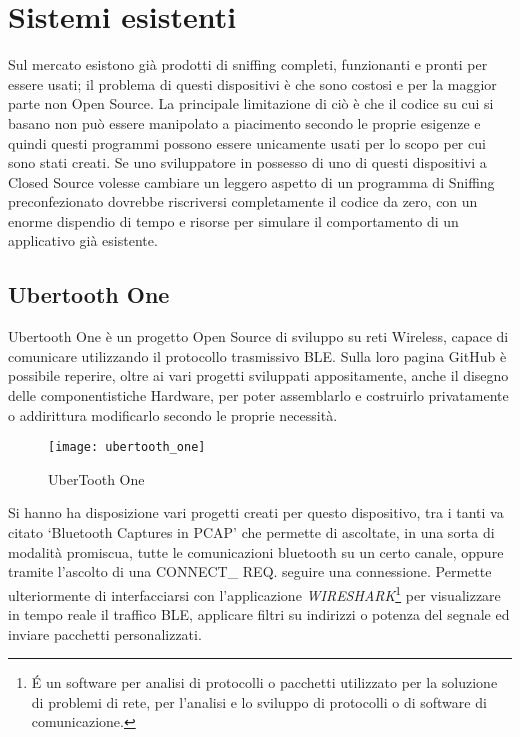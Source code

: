 \newpage 

\section{Sistemi esistenti}
Sul mercato esistono già prodotti di sniffing completi, funzionanti e pronti per essere usati; il problema di questi dispositivi è che sono costosi e per la maggior parte non Open Source. La principale limitazione di ciò è che il codice su cui si basano non può essere manipolato a piacimento secondo le proprie esigenze e quindi questi programmi possono essere unicamente usati per lo scopo per cui sono stati creati. Se uno sviluppatore in possesso di uno di questi dispositivi a Closed Source volesse cambiare un leggero aspetto di un programma di Sniffing preconfezionato dovrebbe riscriversi completamente il codice da zero, con un enorme dispendio di tempo e risorse per simulare il comportamento di un applicativo già esistente.

\subsection{Ubertooth One}
Ubertooth One è un progetto Open Source di sviluppo su reti Wireless, capace di comunicare utilizzando il protocollo trasmissivo BLE. Sulla loro pagina GitHub \cite{ubertooth_github_web} è possibile reperire, oltre ai vari progetti sviluppati appositamente, anche il disegno delle componentistiche Hardware, per poter assemblarlo e costruirlo privatamente o addirittura modificarlo secondo le proprie necessità.

\begin{figure}[H]
\texttt{[image: ubertooth\_one]}
\centering
\caption{UberTooth One}
\end{figure}

Si hanno ha disposizione vari progetti creati per questo dispositivo, tra i tanti va citato \lq Bluetooth Captures in PCAP\rq  \cite{ubertooth_pcap_web} che permette di ascoltate, in una sorta di modalità promiscua, tutte le comunicazioni bluetooth su un certo canale, oppure tramite l'ascolto di una CONNECT\_ REQ. seguire una connessione. Permette ulteriormente di interfacciarsi con l'applicazione \emph{WIRESHARK}\footnote{\'E un software per analisi di protocolli o pacchetti utilizzato per la soluzione di problemi di rete, per l'analisi e lo sviluppo di protocolli o di software di comunicazione.} per visualizzare in tempo reale il traffico BLE, applicare filtri su indirizzi o potenza del segnale ed inviare pacchetti personalizzati.

